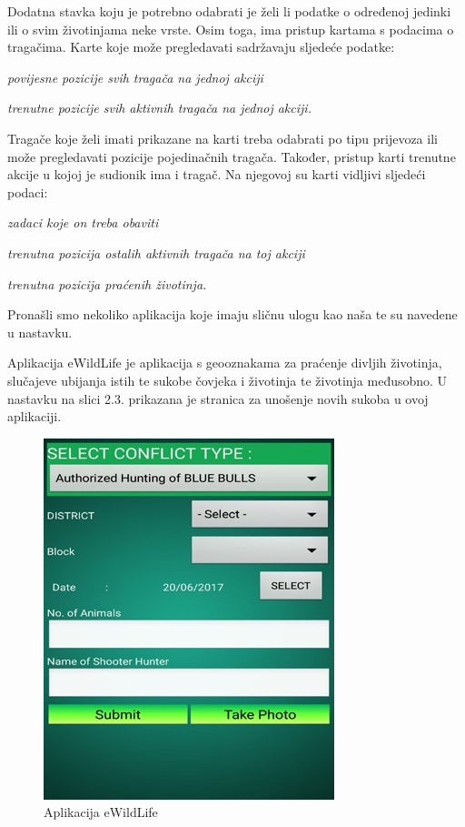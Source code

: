		Dodatna stavka koju je potrebno odabrati je želi li podatke o određenoj jedinki ili o svim životinjama neke vrste. 
		Osim toga, ima pristup kartama s podacima o tragačima. Karte koje može pregledavati sadržavaju sljedeće podatke:
		\begin{packed_item}
			\item \textit{povijesne pozicije svih tragača na jednoj akciji}
			\item \textit{trenutne pozicije svih aktivnih tragača na jednoj akciji.}
		\end{packed_item}
		
		Tragače koje želi imati prikazane na karti treba odabrati po tipu prijevoza ili može pregledavati pozicije pojedinačnih tragača.
		Također, pristup karti trenutne akcije u kojoj je sudionik ima i tragač.
		Na njegovoj su karti vidljivi sljedeći podaci:
		\begin{packed_item}
			\item \textit{zadaci koje on treba obaviti}
			\item \textit{trenutna pozicija ostalih aktivnih tragača na toj akciji}
			\item \textit{trenutna pozicija praćenih životinja.}
		\end{packed_item}
		
		Pronašli smo nekoliko aplikacija koje imaju sličnu ulogu kao naša te su navedene u nastavku.
		
		Aplikacija eWildLife je aplikacija s geooznakama za praćenje divljih životinja, slučajeve ubijanja istih te sukobe čovjeka i životinja te životinja međusobno. U nastavku na slici 2.3. prikazana je stranica za unošenje novih sukoba u ovoj aplikaciji.
		
		\begin{figure}[H]
			\includegraphics[scale=0.75]{slike/primjera1.JPG} %
			\centering
			\caption{Aplikacija eWildLife}
			\label{fig:ewildlife} %
		\end{figure}
		
